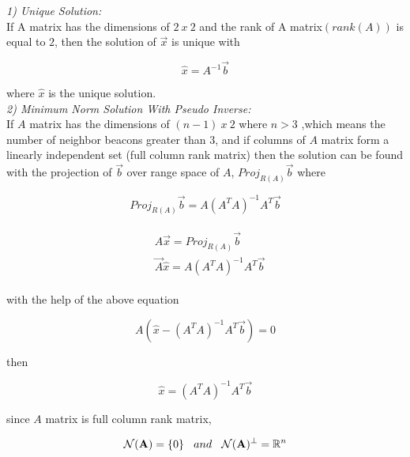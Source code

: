 \textit{1) Unique Solution:}\\
 If A matrix has the dimensions of $2\ x\ 2$ and the rank of A matrix$(rank(A))$ is equal to $2$, then the solution of $\vec{x}$ is unique with \cite{linear_ders_notu}

\begin{equation}
\hat{x} = A^{-1}\vec{b}
\end{equation}

where $\hat{x}$ is the unique solution. \\
  
\textit{ 2) Minimum Norm Solution With Pseudo Inverse:} \\  
If $A$ matrix has the dimensions of $(n-1)\ x\ 2$ where $n>3$ ,which means the number of neighbor beacons greater than $3$, and if columns of $A$ matrix form a linearly independent set (full column rank matrix) then the solution can be found with the projection of $\vec{b}$ over range space of $A$, $Proj_{R(A)}\vec{b}$ where \cite{linear_ders_notu}

\begin{equation}
Proj_{R(A)}\vec{b} = A (A^TA)^{-1}A^T\vec{b}
\end{equation}

\begin{align}
\begin{split}
& A\vec{x} = Proj_{R(A)}\vec{b}\\
& \vec{A}\hat{x} = A(A^TA)^{-1}A^T\vec{b}
\end{split}
\end{align}
 
with the help of the above equation

\begin{equation}
 A(\hat{x} - (A^TA)^{-1}A^T\vec{b}) = 0
\end{equation}

then 

\begin{equation}
\hat{x} = (A^TA)^{-1}A^T\vec{b}
\end{equation}
  
since $A$ matrix is full column rank matrix,

\begin{align}
\begin{split}
\mathcal{N}(\mathbf{A}) = \{0\} \hspace{0.3cm}  and  \hspace{0.3cm}  \mathcal{N}(\mathbf{A})^\perp =\mathbb{R} ^n 
\end{split}
\end{align}
  
